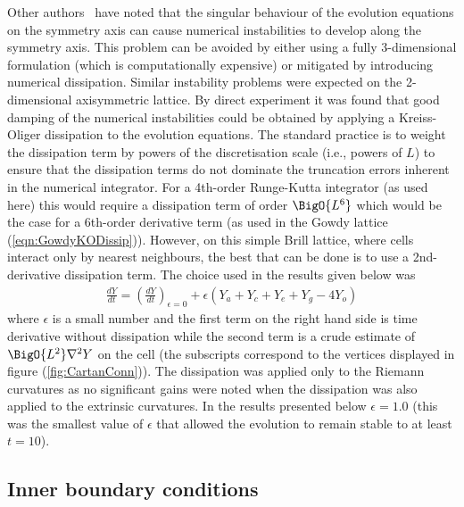 \documentclass[a4paper,12pt]{article}
\numberwithin{equation}{section}
\begin{document}
Other authors~\cite{Choptuik:2003-01,garfinkle:2001-01} have noted that the singular
behaviour of the evolution equations on the symmetry axis can cause numerical instabilities
to develop along the symmetry axis. This problem can be avoided by either using a fully
3-dimensional formulation (which is computationally expensive) or mitigated by introducing
numerical dissipation. Similar instability problems were expected on the 2-dimensional
axisymmetric lattice. By direct experiment it was found that good damping of the numerical
instabilities could be obtained by applying a Kreiss-Oliger dissipation to the evolution
equations. The standard practice is to weight the dissipation term by powers of the
discretisation scale (i.e., powers of $L$) to ensure that the dissipation terms do not
dominate the truncation errors inherent in the numerical integrator. For a 4th-order
Runge-Kutta integrator (as used here) this would require a dissipation term of order
$\BigO{L^6}$ which would be the case for a 6th-order derivative term (as used in the Gowdy
lattice (\ref{eqn:GowdyKODissip})). However, on this simple Brill lattice, where cells
interact only by nearest neighbours, the best that can be done is to use a 2nd-derivative
dissipation term. The choice used in the results given below was
\begin{align}
   \label{eqn:BrillKODissip}
   \frac{dY}{dt} = \left(\frac{dY}{dt}\right)_{\epsilon=0}
                 + \epsilon \left(Y_a+Y_c+Y_e+Y_g-4Y_o\right)
\end{align}
where $\epsilon$ is a small number and the first term on the right hand side is time
derivative without dissipation while the second term is a crude estimate of
$\BigO{L^2}\nabla^2Y$ on the cell (the subscripts correspond to the vertices displayed in
figure (\ref{fig:CartanConn})). The dissipation was applied only to the Riemann curvatures as
no significant gains were noted when the dissipation was also applied to the extrinsic
curvatures. In the results presented below $\epsilon=1.0$ (this was the smallest value of
$\epsilon$ that allowed the evolution to remain stable to at least $t=10$).

\subsection{Inner boundary conditions}
\label{sec:BrillInnerBCs}
\end{document}
